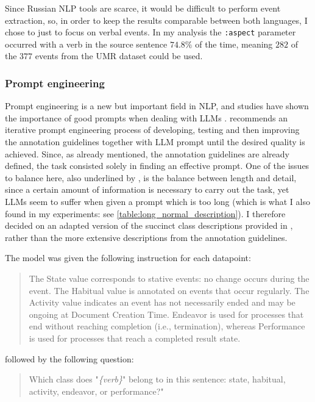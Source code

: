 Since Russian NLP tools are scarce, it would be difficult to perform event extraction, so, in order to keep the results comparable between both languages, I chose to just to focus on verbal events. In my analysis the \texttt{:aspect} parameter occurred with a verb in the source sentence $74.8\%$ of the time, meaning $282$ of the $377$ events from the UMR dataset could be used.

\subsubsection*{Prompt engineering}
Prompt engineering is a new but important field in NLP, and studies have shown the importance of good prompts when dealing with LLMs \citep{kaddour2023challenges, hsieh2023automatic, sahoo2024systematic}. \citet{törnberg2024best} recommends an iterative prompt engineering process of developing, testing and then improving the annotation guidelines together with LLM prompt until the desired quality is achieved. Since, as already mentioned, the annotation guidelines are already defined, the task consisted solely in finding an effective prompt. One of the issues to balance here, also underlined by \citet{törnberg2024best}, is the balance between length and detail, since a certain amount of information is necessary to carry out the task, yet LLMs seem to suffer when given a prompt which is too long (which is what I also found in my experiments: see \ref{table:long_normal_description}). I therefore decided on an adapted version of the succinct class descriptions provided in \citet{umr}, rather than the more extensive descriptions from the annotation guidelines.

The model was given the following instruction for each datapoint:
\begin{quotation}
    The State value corresponds to stative events: no change occurs during the event. The Habitual value is annotated on events that occur regularly. The Activity value indicates an event has not necessarily ended and may be ongoing at Document Creation Time. Endeavor is used for processes that end without reaching completion (i.e., termination), whereas Performance is used for processes that reach a completed result state.
\end{quotation}
followed by the following question:
\begin{quotation}
    Which class does "\emph{\{verb\}}" belong to in this sentence: state, habitual, activity, endeavor, or performance?"
\end{quotation}

